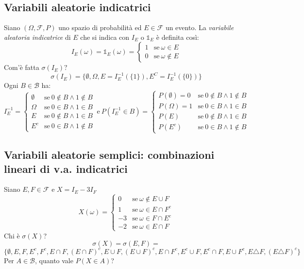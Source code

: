 \documentclass[12pt, a4paper]{report}
\theoremstyle{definition}
\DeclareRobustCommand{\F}{\mathcal{F}}%
\DeclareRobustCommand{\B}{\mathcal{B}}%
\DeclareRobustCommand{\probspace}{(\Omega,\F,P)}
\begin{document}
\subsection{Variabili aleatorie indicatrici}
Siano $\probspace$ uno spazio di probabilità ed \(E\in\F\) un evento. La \emph{
variabile aleatoria indicatrice} di $E$ che si indica con $I_E$ o $\mathds{1}_E$
è definita così:
\[I_E(\omega)=\mathds{1}_E(\omega)=\begin{cases}
	{1} & \text{se}\ {\omega\in E}\\
	{0} & \text{se}\ {\omega\notin E}
\end{cases}\]
Com'è fatta $\sigma(I_E)?$
\[\sigma(I_E)=\{\emptyset, \Omega, E=I_E^{-1}(\{1\}), E^C=I_E^{-1}(\{0\})\}\]
Ogni \(B\in\B\) ha:
\[I_E^{-1}=\begin{cases}
	{\emptyset} & \text{se}\ {0\notin B\wedge 1\notin B}\\
	{\Omega} & \text{se}\ {0\in B\wedge 1\in B}\\
	{E} & \text{se}\ {0\notin B\wedge 1\in B}\\
	{E^c} & \text{se}\ {0\in B\wedge 1\notin B}
\end{cases}\ \text{e}\ 
P(I_E^{-1}\in B)=\begin{cases}
	{P(\emptyset)=0} & \text{se}\ {0\notin B\wedge 1\notin B}\\
	{P(\Omega)=1} & \text{se}\ {0\in B\wedge 1\in B}\\
	{P(E)} & \text{se}\ {0\notin B\wedge 1\in B}\\
	{P(E^c)} & \text{se}\ {0\in B\wedge 1\notin B}
\end{cases}\]

\subsection{Variabili aleatorie semplici: combinazioni lineari di v.a. indicatrici}
Siano \(E,F\in\F\) e \(X=I_E - 3I_F\)
\[X(\omega)=\begin{cases}
	{0} & \text{se}\ {\omega\notin E\cup F}\\
	{1} & \text{se}\ {\omega\in E\cap F^c}\\
	{-3} & \text{se}\ {\omega\in F\cap E^c}\\
	{-2} & \text{se}\ {\omega\in E\cap F}
\end{cases}\]
Chi è $\sigma(X)$?
\[\sigma(X)=\sigma(E,F)=\]
\[\{\emptyset, E, F, E^c, F^c, E\cap F, (E\cap F)^c, E\cup F, (E\cup F)^c,
E\cap F^c, E^c\cup F, E^c\cap F, E\cup F^c, E\triangle F, (E\triangle F)^c\}\]
Per \(A\in\B\), quanto vale \(P(X\in A)\)?
\end{document}
